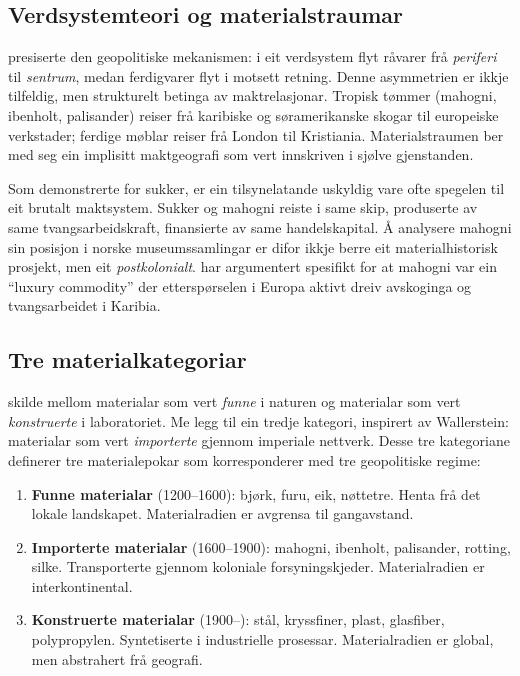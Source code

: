 \documentclass[10pt, a4paper, twocolumn]{article}
\begin{document}
\subsection{Verdsystemteori og materialstraumar}

\citet{wallerstein2004} presiserte den geopolitiske mekanismen: i eit verdsystem flyt råvarer frå \emph{periferi} til \emph{sentrum}, medan ferdigvarer flyt i motsett retning. Denne asymmetrien er ikkje tilfeldig, men strukturelt betinga av maktrelasjonar. Tropisk tømmer (mahogni, ibenholt, palisander) reiser frå karibiske og søramerikanske skogar til europeiske verkstader; ferdige møblar reiser frå London til Kristiania. Materialstraumen ber med seg ein implisitt maktgeografi som vert innskriven i sjølve gjenstanden.

Som \citet{mintz1985} demonstrerte for sukker, er ein tilsynelatande uskyldig vare ofte spegelen til eit brutalt maktsystem. Sukker og mahogni reiste i same skip, produserte av same tvangsarbeidskraft, finansierte av same handelskapital. Å analysere mahogni sin posisjon i norske museumssamlingar er difor ikkje berre eit materialhistorisk prosjekt, men eit \emph{postkolonialt}. \citet{anderson1995} har argumentert spesifikt for at mahogni var ein ``luxury commodity'' der etterspørselen i Europa aktivt dreiv avskoginga og tvangsarbeidet i Karibia.

\subsection{Tre materialkategoriar}

\citet{manzini1986} skilde mellom materialar som vert \emph{funne} i naturen og materialar som vert \emph{konstruerte} i laboratoriet. Me legg til ein tredje kategori, inspirert av Wallerstein: materialar som vert \emph{importerte} gjennom imperiale nettverk. Desse tre kategoriane definerer tre materialepokar som korresponderer med tre geopolitiske regime:

\begin{enumerate}
  \item \textbf{Funne materialar} (1200--1600): bjørk, furu, eik, nøttetre. Henta frå det lokale landskapet. Materialradien er avgrensa til gangavstand.
  \item \textbf{Importerte materialar} (1600--1900): mahogni, ibenholt, palisander, rotting, silke. Transporterte gjennom koloniale forsyningskjeder. Materialradien er interkontinental.
  \item \textbf{Konstruerte materialar} (1900--): stål, kryssfiner, plast, glasfiber, polypropylen. Syntetiserte i industrielle prosessar. Materialradien er global, men abstrahert frå geografi.
\end{enumerate}
\end{document}
